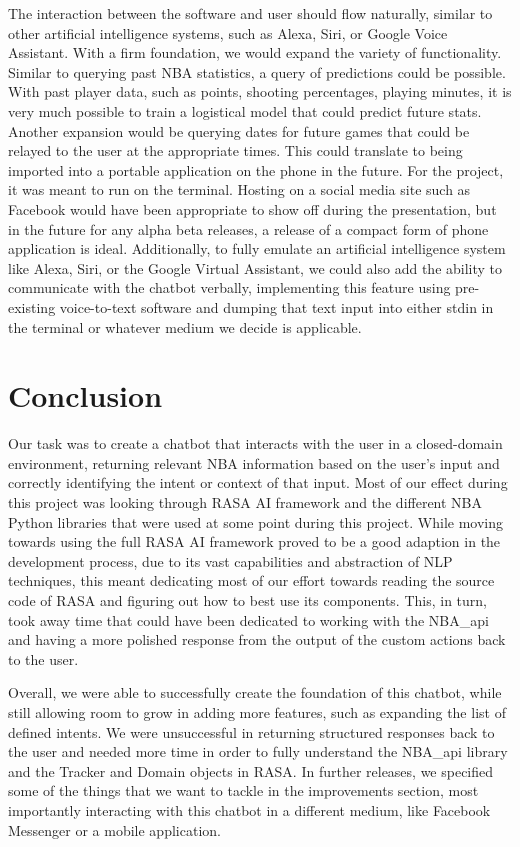 \documentclass[conference]{IEEEtran}
\begin{document}
The interaction between the software and user should flow naturally, similar to other artificial intelligence systems, such as Alexa, Siri, or Google Voice Assistant. With a firm foundation, we would expand the variety of functionality. Similar to querying past NBA statistics, a query of predictions could be possible. With past player data, such as points, shooting percentages, playing minutes, it is very much possible to train a logistical model that could predict future stats. Another expansion would be querying dates for future games that could be relayed to the user at the appropriate times. This could translate to being imported into a portable application on the phone in the future. For the project, it was meant to run on the terminal. Hosting on a social media site such as Facebook would have been appropriate to show off during the presentation, but in the future for any alpha beta releases, a release of a compact form of phone application is ideal. Additionally, to fully emulate an artificial intelligence system like Alexa, Siri, or the Google Virtual Assistant, we could also add the ability to communicate with the chatbot verbally, implementing this feature using pre-existing voice-to-text software and dumping that text input into either stdin in the terminal or whatever medium we decide is applicable.

\section*{Conclusion}
Our task was to create a chatbot that interacts with the user in a closed-domain environment, returning relevant NBA information based on the user's input and correctly identifying the intent or context of that input. Most of our effect during this project was looking through RASA AI framework and the different NBA Python libraries that were used at some point during this project. While moving towards using the full RASA AI framework proved to be a good adaption in the development process, due to its vast capabilities and abstraction of NLP techniques, this meant dedicating most of our effort towards reading the source code of RASA and figuring out how to best use its components. This, in turn, took away time that could have been dedicated to working with the NBA\_api and having a more polished response from the output of the custom actions back to the user. 

Overall, we were able to successfully create the foundation of this chatbot, while still allowing room to grow in adding more features, such as expanding the list of defined intents. We were unsuccessful in returning structured responses back to the user and needed more time in order to fully understand the NBA\_api library and the Tracker and Domain objects in RASA. In further releases, we specified some of the things that we want to tackle in the improvements section, most importantly interacting with this chatbot in a different medium, like Facebook Messenger or a mobile application.
\end{document}
